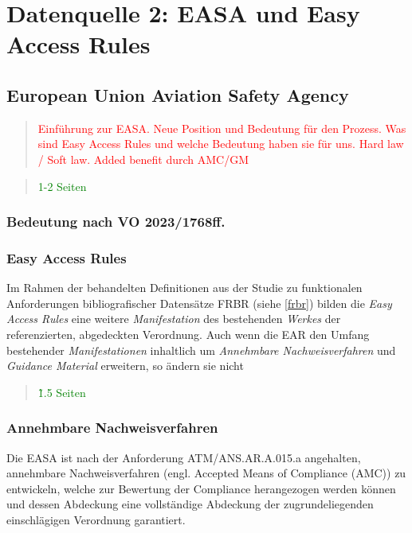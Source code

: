 \chapter{Datenquelle 2: EASA und Easy Access Rules}

    \section{European Union Aviation Safety Agency}

\begin{quote}
\textcolor{red}{Einführung zur EASA. Neue Position und Bedeutung für den Prozess. Was sind Easy Access Rules und welche Bedeutung haben sie für uns. Hard law / Soft law. Added benefit durch AMC/GM}
\end{quote}
\begin{quote}
\textcolor{green}{1-2 Seiten}
\end{quote}
        
        \subsection{Bedeutung nach VO 2023/1768ff.}
        
        \pagebreak
        \subsection{Easy Access Rules}

Im Rahmen der behandelten Definitionen aus der Studie zu funktionalen Anforderungen bibliografischer Datensätze \acs{FRBR} (siehe \ref{frbr}) bilden die \textit{Easy Access Rules} eine weitere \textit{Manifestation} des bestehenden \textit{Werkes} der referenzierten, abgedeckten Verordnung.
Auch wenn die \ac{EAR} den Umfang bestehender \textit{Manifestationen} inhaltlich um \textit{Annehmbare Nachweisverfahren} und \textit{Guidance Material} erweitern, so ändern sie nicht 



\begin{quote}
\textcolor{green}{\~1.5 Seiten}
\end{quote}

        \pagebreak
        \subsection{Annehmbare Nachweisverfahren}

        Die \ac{EASA} ist nach der Anforderung \textsf{ATM/ANS.AR.A.015.a} angehalten, annehmbare Nachweisverfahren (engl. Accepted Means of Compliance (AMC)) zu entwickeln, welche zur Bewertung der Compliance herangezogen werden können und dessen Abdeckung eine vollständige Abdeckung der zugrundeliegenden einschlägigen Verordnung garantiert. 
        \cite[Anh. II]{2017R0373}


